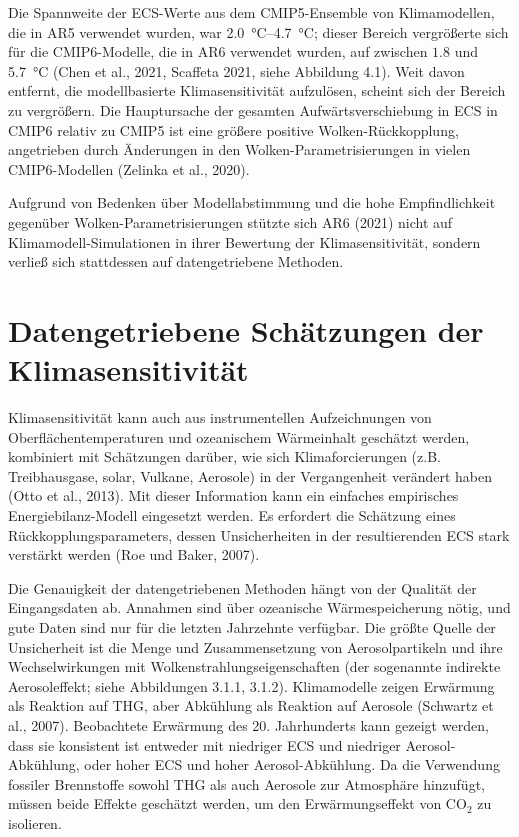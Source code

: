 \documentclass[12pt,paper=a4,DIV=12,parskip=never,chapterprefix=false,headings=standardclasses]{scrreprt}
\begin{document}
Die Spannweite der ECS-Werte aus dem CMIP5-Ensemble von Klimamodellen, die in AR5 verwendet wurden, war \SIrange{2.0}{4.7}{\celsius}; dieser Bereich vergrößerte sich für die CMIP6-Modelle, die in AR6 verwendet wurden, auf zwischen $1.8$ und \SI{5.7}{\celsius} (Chen et al., 2021, Scaffeta 2021, siehe Abbildung 4.1). Weit davon entfernt, die modellbasierte Klimasensitivität aufzulösen, scheint sich der Bereich zu vergrößern. Die Hauptursache der gesamten Aufwärtsverschiebung in ECS in CMIP6 relativ zu CMIP5 ist eine größere positive Wolken-Rückkopplung, angetrieben durch Änderungen in den Wolken-Parametrisierungen in vielen CMIP6-Modellen (Zelinka et al., 2020).

Aufgrund von Bedenken über Modellabstimmung und die hohe Empfindlichkeit gegenüber Wolken-Parametrisierungen stützte sich AR6 (2021) nicht auf Klimamodell-Simulationen in ihrer Bewertung der Klimasensitivität, sondern verließ sich stattdessen auf datengetriebene Methoden.

\section{Datengetriebene Schätzungen der Klimasensitivität}
Klimasensitivität kann auch aus instrumentellen Aufzeichnungen von Oberflächentemperaturen und ozeanischem Wärmeinhalt geschätzt werden, kombiniert mit Schätzungen darüber, wie sich Klimaforcierungen (z.B. Treibhausgase, solar, Vulkane, Aerosole) in der Vergangenheit verändert haben (Otto et al., 2013). Mit dieser Information kann ein einfaches empirisches Energiebilanz-Modell eingesetzt werden. Es erfordert die Schätzung eines Rückkopplungsparameters, dessen Unsicherheiten in der resultierenden ECS stark verstärkt werden (Roe und Baker, 2007).

Die Genauigkeit der datengetriebenen Methoden hängt von der Qualität der Eingangsdaten ab. Annahmen sind über ozeanische Wärmespeicherung nötig, und gute Daten sind nur für die letzten Jahrzehnte verfügbar. Die größte Quelle der Unsicherheit ist die Menge und Zusammensetzung von Aerosolpartikeln und ihre Wechselwirkungen mit Wolkenstrahlungseigenschaften (der sogenannte indirekte Aerosoleffekt; siehe Abbildungen 3.1.1, 3.1.2). Klimamodelle zeigen Erwärmung als Reaktion auf THG, aber Abkühlung als Reaktion auf Aerosole (Schwartz et al., 2007). Beobachtete Erwärmung des 20. Jahrhunderts kann gezeigt werden, dass sie konsistent ist entweder mit niedriger ECS und niedriger Aerosol-Abkühlung, oder hoher ECS und hoher Aerosol-Abkühlung. Da die Verwendung fossiler Brennstoffe sowohl THG als auch Aerosole zur Atmosphäre hinzufügt, müssen beide Effekte geschätzt werden, um den Erwärmungseffekt von CO$_2$ zu isolieren.
\end{document}
